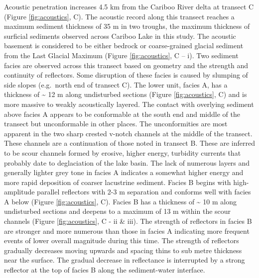\documentclass[Royal,times,doublespace,sageh]{sagej}
\begin{document}
Acoustic penetration increases 4.5 km from the Cariboo River delta at
transect C (Figure \ref{fig:acoustics}, C). The acoustic record along
this transect reaches a maximum sediment thickness of 35 m in two
troughs, the maximum thickness of surficial sediments observed across
Cariboo Lake in this study. The acoustic basement is considered to be
either bedrock or coarse-grained glacial sediment from the Last Glacial
Maximum (Figure \ref{fig:acoustics}, C -- i). Two sediment facies are
observed across this transect based on geometry and the strength and
continuity of reflectors. Some disruption of these facies is caused by
slumping of side slopes (e.g.~north end of transect C). The lower unit,
facies A, has a thickness of \textasciitilde{} 12 m along undisturbed
sections (Figure \ref{fig:acoustics}, C) and is more massive to weakly
acoustically layered. The contact with overlying sediment above facies A
appears to be conformable at the south end and middle of the transect
but unconformable in other places. The unconformities are most apparent
in the two sharp crested v-notch channels at the middle of the transect.
These channels are a continuation of those noted in transect B. These
are inferred to be scour channels formed by erosive, higher energy,
turbidity currents that probably date to deglaciation of the lake basin.
The lack of numerous layers and generally lighter grey tone in facies A
indicates a somewhat higher energy and more rapid deposition of coarser
lacustrine sediment. Facies B begins with high-amplitude parallel
reflectors with 2-3 m separation and conforms well with facies A below
(Figure \ref{fig:acoustics}, C). Facies B has a thickness of
\textasciitilde{} 10 m along undisturbed sections and deepens to a
maximum of 13 m within the scour channels (Figure \ref{fig:acoustics}, C
- ii \& iii). The strength of reflectors in facies B are stronger and
more numerous than those in facies A indicating more frequent events of
lower overall magnitude during this time. The strength of reflectors
gradually decreases moving upwards and spacing thins to sub metre
thickness near the surface. The gradual decrease in reflectance is
interrupted by a strong reflector at the top of facies B along the
sediment-water interface.
\end{document}
